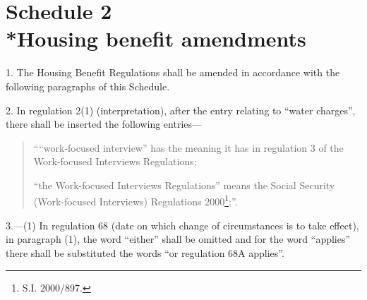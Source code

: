 \documentclass[12pt,a4paper]{article}
\begin{document}
\part[Schedule 2 --- Housing benefit amendments]{Schedule 2\\*Housing benefit amendments}

\renewcommand\parthead{--- Schedule 2}

1.  The Housing Benefit Regulations shall be amended in accordance with the following paragraphs of this Schedule.

\medskip

2.  In regulation 2(1) (interpretation), after the entry relating to “water charges”, there shall be inserted the following entries—
\begin{quotation}
    ““work-focused interview” has the meaning it has in regulation 3 of the Work-focused Interviews Regulations;

    “the Work-focused Interviews Regulations” means the Social Security (Work-focused Interviews) Regulations 2000\footnote{\frenchspacing S.I. 2000/897.};”. 
\end{quotation}

\medskip

3.---(1)  In regulation 68 (date on which change of circumstances is to take effect), in paragraph (1), the word “either” shall be omitted and for the word “applies” there shall be substituted the words “or regulation 68A applies”.
\end{document}
